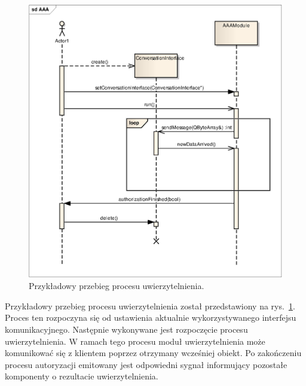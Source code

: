 \begin{figure}[htpb]
  \centering
  \caption{Przykładowy przebieg procesu uwierzytelnienia.}
  \label{fig:sekwencjaAuth}
  \includegraphics[width=1\textwidth]{img/aaa}
\end{figure}

Przykładowy przebieg procesu uwierzytelnienia został przedstawiony na
rys.~\ref{fig:sekwencjaAuth}. Proces ten rozpoczyna się od ustawienia
aktualnie wykorzystywanego interfejsu komunikacyjnego. Następnie
wykonywane jest rozpoczęcie procesu uwierzytelnienia. W ramach tego
procesu moduł uwierzytelnienia może komunikować się z klientem poprzez
otrzymany wcześniej obiekt. Po zakończeniu procesu autoryzacji
emitowany jest odpowiedni sygnał informujący pozostałe komponenty o
rezultacie uwierzytelnienia.

